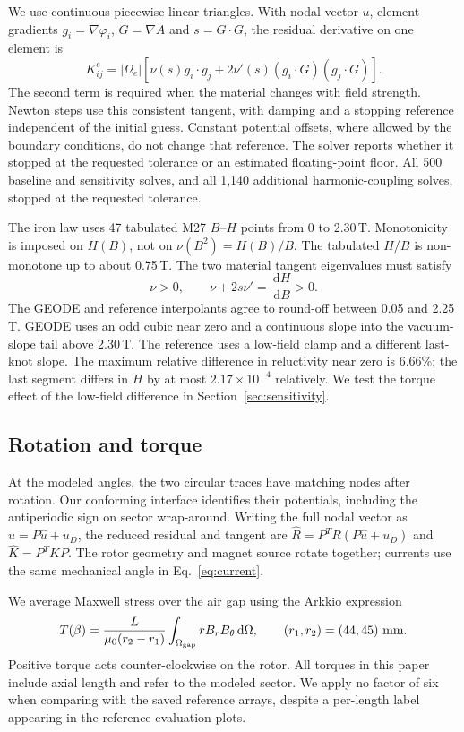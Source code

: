 \documentclass{anvil-paper}
\newcommand{\dd}{\,\mathrm{d}}
\begin{document}
We use continuous piecewise-linear triangles. With nodal vector $u$,
element gradients $g_i=\nabla\varphi_i$, $G=\nabla A$ and $s=G\cdot G$,
the residual derivative on one element is
\begin{equation}
 K^e_{ij}=|\Omega_e|\left[\nu(s)g_i\cdot g_j
       +2\nu'(s)(g_i\cdot G)(g_j\cdot G)\right].
 \label{eq:tangent}
\end{equation}
The second term is required when the material changes with field strength.
Newton steps use this consistent tangent, with damping and a stopping
reference independent of the initial guess. Constant potential offsets,
where allowed by the boundary conditions, do not change that reference.
The solver reports whether it stopped at the requested tolerance or an
estimated floating-point floor. All 500 baseline and sensitivity solves, and all 1,140
additional harmonic-coupling solves, stopped at the requested tolerance.

The iron law uses 47 tabulated M27 $B$--$H$ points from 0 to 2.30\,T.
Monotonicity is imposed on $H(B)$, not on $\nu(B^2)=H(B)/B$.
The tabulated $H/B$ is non-monotone up to about 0.75\,T.
The two material tangent eigenvalues must satisfy
\begin{equation}
 \nu>0,\qquad \nu+2s\nu'=\frac{\dd H}{\dd B}>0.
\end{equation}
The GEODE and reference interpolants agree to round-off between 0.05 and
2.25\,T. GEODE uses an odd cubic near zero and a continuous slope into the
vacuum-slope tail above 2.30\,T. The reference uses a low-field clamp and
a different last-knot slope. The maximum relative difference in
reluctivity near zero is 6.66\%; the last segment differs in $H$ by at
most $2.17\times10^{-4}$ relatively. We test the torque effect of the
low-field difference in Section~\ref{sec:sensitivity}.

\subsection{Rotation and torque}
At the modeled angles, the two circular traces have matching nodes after
rotation. Our conforming interface identifies their potentials, including
the antiperiodic sign on sector wrap-around. Writing the full nodal vector
as $u=P\hat u+u_D$, the reduced residual and tangent are
$\hat R=P^T R(P\hat u+u_D)$ and $\hat K=P^T K P$.
The rotor geometry and magnet source rotate together; currents use the
same mechanical angle in Eq.~\eqref{eq:current}.

We average Maxwell stress over the air gap using the Arkkio expression
\citep{arkkio1987}
\begin{equation}
 T(\beta)=\frac{L}{\mu_0(r_2-r_1)}
  \int_{\Omega_{\rm gap}}r B_r B_\theta\dd\Omega,
 \qquad(r_1,r_2)=(44,45)\ {\rm mm}.
 \label{eq:torque}
\end{equation}
Positive torque acts counter-clockwise on the rotor. All torques in this
paper include axial length and refer to the modeled sector. We apply no
factor of six when comparing with the saved reference arrays, despite a
per-length label appearing in the reference evaluation plots.
\end{document}
